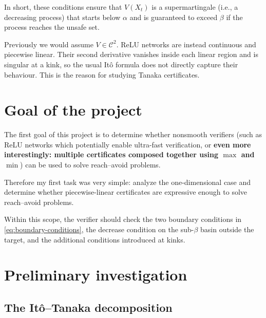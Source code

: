\documentclass[10pt]{extarticle}
\begin{document}
In short, these conditions ensure that $V(X_t)$ is a supermartingale (i.e., a decreasing process) that starts below $\alpha$ and is guaranteed to exceed $\beta$ if the process reaches the unsafe
set.

Previously we would assume $V\in\mathcal C^2$.  ReLU networks are
instead continuous and piecewise linear.  Their second derivative vanishes
inside each linear region and is singular at a kink, so the usual It\^o formula
does not directly capture their behaviour.  This is the reason for studying
Tanaka certificates.

\section{Goal of the project}

The first goal of this project is to determine whether nonsmooth verifiers 
(such as ReLU networks which potentially enable ultra-fast verification, or \textbf{even more interestingly: multiple certificates composed together  
using $\max$ and $\min$})
can be used to solve reach--avoid problems.  

Therefore my first task was very simple: analyze the one-dimensional case and determine whether piecewise-linear certificates are expressive enough to solve reach--avoid problems.  

Within this scope, the verifier
should check the two boundary conditions in
\eqref{eq:boundary-conditions}, the decrease condition on the sub-$\beta$
basin outside the target, and the additional conditions introduced at kinks.

\section{Preliminary investigation}

\subsection{The It\^o--Tanaka decomposition}
\end{document}
